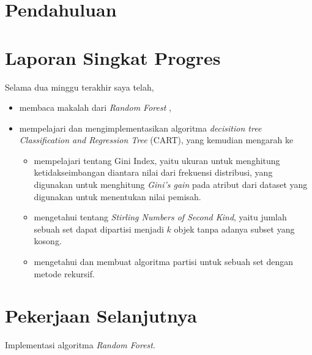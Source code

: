 






\section{Pendahuluan}



\section{Laporan Singkat Progres}

Selama dua minggu terakhir saya telah,
\begin{itemize}
\item membaca makalah dari \textit{Random Forest} \cite{breiman2001random},
\item mempelajari dan mengimplementasikan algoritma \textit{decisition tree}
\textit{Classification and Regression Tree} (CART), yang kemudian mengarah ke
	\begin{itemize}
	\item mempelajari tentang Gini Index, yaitu ukuran untuk menghitung
	ketidakseimbangan diantara nilai dari frekuensi distribusi, yang
	digunakan untuk menghitung \textit{Gini's gain} pada atribut dari
	dataset yang digunakan untuk menentukan nilai pemisah.
	\item mengetahui tentang \textit{Stirling Numbers of Second Kind},
	yaitu jumlah sebuah set dapat dipartisi menjadi $ k $ objek tanpa
	adanya subset yang kosong.
	\item mengetahui dan membuat algoritma partisi untuk sebuah set dengan
	metode rekursif.
	\end{itemize}
\end{itemize}



\section{Pekerjaan Selanjutnya}

Implementasi algoritma \textit{Random Forest}.


\advisorsignature

\clearpage
{}
\printbibliography

\newpage
\appendix



